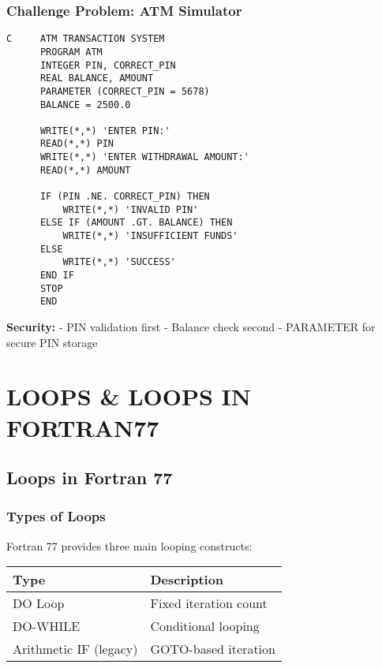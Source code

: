 \documentclass{book}
\begin{document}
\subsection*{Challenge Problem: ATM Simulator}
\begin{verbatim}
C     ATM TRANSACTION SYSTEM
      PROGRAM ATM
      INTEGER PIN, CORRECT_PIN
      REAL BALANCE, AMOUNT
      PARAMETER (CORRECT_PIN = 5678)
      BALANCE = 2500.0
      
      WRITE(*,*) 'ENTER PIN:'
      READ(*,*) PIN
      WRITE(*,*) 'ENTER WITHDRAWAL AMOUNT:'
      READ(*,*) AMOUNT
      
      IF (PIN .NE. CORRECT_PIN) THEN
          WRITE(*,*) 'INVALID PIN'
      ELSE IF (AMOUNT .GT. BALANCE) THEN
          WRITE(*,*) 'INSUFFICIENT FUNDS'
      ELSE
          WRITE(*,*) 'SUCCESS'
      END IF
      STOP
      END
\end{verbatim}
\textbf{Security:}
- PIN validation first
- Balance check second
- PARAMETER for secure PIN storage

\chapter{LOOPS \& LOOPS IN FORTRAN77}

\section{Loops in Fortran 77}

\subsection*{Types of Loops}
Fortran 77 provides three main looping constructs:
\begin{center}
\begin{tabular}{|l|l|}
\hline
\textbf{Type} & \textbf{Description} \\ 
\hline
DO Loop & Fixed iteration count \\
DO-WHILE & Conditional looping \\
Arithmetic IF (legacy) & GOTO-based iteration \\
\hline
\end{tabular}
\end{center}
\end{document}
